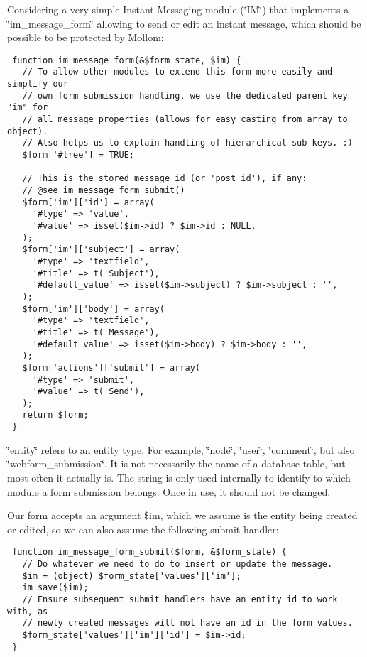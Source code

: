 Considering a very simple Instant Messaging module (\char`\"{}IM\char`\"{}) that implements a \char`\"{}im\_\-message\_\-form\char`\"{} allowing to send or edit an instant message, which should be possible to be protected by Mollom: 

\begin{Code}\begin{verbatim} function im_message_form(&$form_state, $im) {
   // To allow other modules to extend this form more easily and simplify our
   // own form submission handling, we use the dedicated parent key "im" for
   // all message properties (allows for easy casting from array to object).
   // Also helps us to explain handling of hierarchical sub-keys. :)
   $form['#tree'] = TRUE;

   // This is the stored message id (or 'post_id'), if any:
   // @see im_message_form_submit()
   $form['im']['id'] = array(
     '#type' => 'value',
     '#value' => isset($im->id) ? $im->id : NULL,
   );
   $form['im']['subject'] = array(
     '#type' => 'textfield',
     '#title' => t('Subject'),
     '#default_value' => isset($im->subject) ? $im->subject : '',
   );
   $form['im']['body'] = array(
     '#type' => 'textfield',
     '#title' => t('Message'),
     '#default_value' => isset($im->body) ? $im->body : '',
   );
   $form['actions']['submit'] = array(
     '#type' => 'submit',
     '#value' => t('Send'),
   );
   return $form;
 }
\end{verbatim}
\end{Code}



\char`\"{}entity\char`\"{} refers to an entity type. For example, \char`\"{}node\char`\"{}, \char`\"{}user\char`\"{}, \char`\"{}comment\char`\"{}, but also \char`\"{}webform\_\-submission\char`\"{}. It is not necessarily the name of a database table, but most often it actually is. The string is only used internally to identify to which module a form submission belongs. Once in use, it should not be changed.

Our form accepts an argument \$im, which we assume is the entity being created or edited, so we can also assume the following submit handler: 

\begin{Code}\begin{verbatim} function im_message_form_submit($form, &$form_state) {
   // Do whatever we need to do to insert or update the message.
   $im = (object) $form_state['values']['im'];
   im_save($im);
   // Ensure subsequent submit handlers have an entity id to work with, as
   // newly created messages will not have an id in the form values.
   $form_state['values']['im']['id'] = $im->id;
 }
\end{verbatim}
\end{Code}



